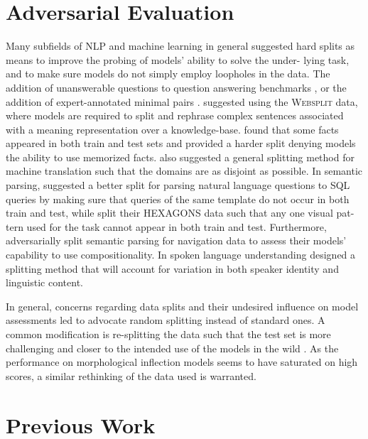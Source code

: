 \documentclass[11pt]{article}
\begin{document}
\section{Adversarial Evaluation}
Many subfields of NLP and machine learning in general suggested hard splits as means to improve the probing of models’ ability to solve the under- lying task, and to make sure models do not simply employ loopholes in the data.
The addition of unanswerable questions to question answering benchmarks \citep{rajpurkar-etal-2018-know}, or the addition of expert-annotated minimal pairs \citep{gardner-etal-2020-evaluating}. 
\citet{narayan-etal-2017-split} suggested using the \textsc{Websplit} data, where models are required to split and rephrase complex sentences associated with a meaning representation over a knowledge-base. 
\citet{aharoni-goldberg-2018-split} found that some facts appeared in both train and test sets and provided a harder split denying models the ability to use memorized facts. \citet{aharoni-goldberg-2020-unsupervised} also suggested a general splitting method for machine translation such that the domains are as disjoint as possible.
In semantic parsing, \citet{finegan-dollak-etal-2018-improving} suggested a better split for parsing natural language questions to SQL queries by making sure that queries of the same template do not occur in both train and test, while \citet{lachmy2022} split their HEXAGONS data such that any one visual pat- tern used for the task cannot appear in both train and test. 
Furthermore, \citet{loula-etal-2018-rearranging} adversarially split semantic parsing for navigation data to assess their models’ capability to use compositionality. In spoken language understanding \citet{arora2021} designed a splitting method that will account for variation in both speaker identity and linguistic content.



In general, concerns regarding data splits and their undesired influence on model assessments led \citet{gorman-bedrick-2019-need} to advocate random splitting instead of standard ones.
A common modification is re-splitting the data such that the test set is more challenging and closer to the intended use of the models in the wild \citep{sogaard-etal-2021-need}. As the performance on morphological inflection models seems to have saturated on high scores, a similar rethinking of the data used is warranted.


\section{Previous Work}
\end{document}
